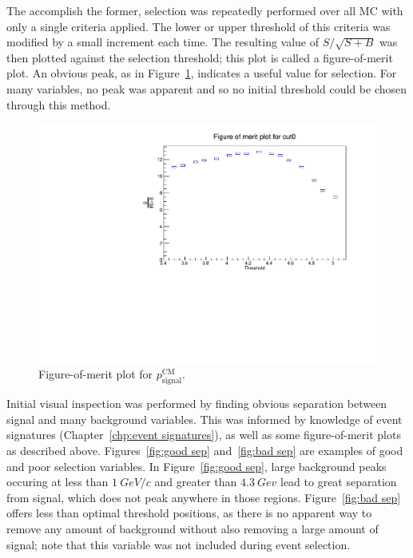 \documentclass[12pt]{thesis}  %
\begin{document}
The accomplish the former, selection was repeatedly performed over all MC with only a single criteria applied. The lower or upper threshold of this criteria was modified by a small increment each time. The resulting value of $S/\sqrt{S+B}$ was then plotted against the selection threshold; this plot is called a figure-of-merit plot. An obvious peak, as in Figure~\ref{fig:fom plot muCM P}, indicates a useful value for selection. For many variables, no peak was apparent and so no initial threshold could be chosen through this method.

\begin{figure}[h]
\centering
\includegraphics[width=0.7\linewidth]{images/fom-cut0.pdf}
\caption[]%
{{\small Figure-of-merit plot for $p_{\text{signal}}^{\text{CM}}$.}}
\label{fig:fom plot muCM P}
\end{figure}

Initial visual inspection was performed by finding obvious separation between signal and many background variables. This was informed by knowledge of event signatures (Chapter~\ref{chp:event signatures}), as well as some figure-of-merit plots as described above. Figures~\ref{fig:good sep} and~\ref{fig:bad sep} are examples of good and poor selection variables. In Figure~\ref{fig:good sep}, large background peaks occuring at less than $\SI{1}{GeV/c}$ and greater than $\SI{4.3}{Gev}$ lead to great separation from signal, which does not peak anywhere in those regions. Figure~\ref{fig:bad sep} offers less than optimal threshold positions, as there is no apparent way to remove any amount of background without also removing a large amount of signal; note that this variable was not included during event selection. 
\end{document}
